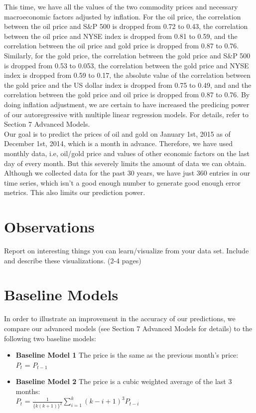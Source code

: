 \documentclass[runningheads]{llncs}
\begin{document}
\noindent This time, we have all the values of the two commodity prices and necessary macroeconomic factors adjusted by inflation. For the oil price, the correlation between the oil price and S\&P 500 is dropped from 0.72 to 0.43, the correlation between the oil price and NYSE index is dropped from 0.81 to 0.59, and the correlation between the oil price and gold price is dropped from 0.87 to 0.76. Similarly, for the gold price, the correlation between the gold price and S\&P 500 is dropped from 0.53 to 0.053, the correlation between the gold price and NYSE index is dropped from 0.59 to 0.17, the absolute value of the correlation between the gold price and the US dollar index is dropped from 0.75 to 0.49, and and the correlation between the gold price and oil price is dropped from 0.87 to 0.76. By doing inflation adjustment, we are certain to have increased the predicing power of our autoregressive with multiple linear regression models. For details, refer to Section 7 Advanced Models. \\

\noindent Our goal is to predict the prices of oil and gold on January 1st, 2015 as of December 1st, 2014, which is a month in advance. Therefore, we have used monthly data, i.e, oil/gold price and values of other economic factors on the last day of every month. But this severely limits the amount of data we can obtain. Although we collected data for the past 30 years, we have just 360 entries in our time series, which isn't a good enough number to generate good enough error metrics. This also limits our prediction power. \\


\section{Observations}

Report on interesting things you can learn/visualize from your data set.  Include and describe these visualizations.  (2-4 pages)


\section{Baseline Models}
In order to illustrate an improvement in the accuracy of our predictions, we compare our advanced models (see Section 7 Advanced Models for details) to the following two baseline models:

\begin {itemize}
\item \textbf{Baseline Model 1} The price is the same as the previous month's price: \\
$P_{t}$ = $P_{t-1}$\\
\item \textbf{Baseline Model 2} The price is a cubic weighted average of the last 3 months: \\
$P_{t}$ = $\frac{1}{\{k(k+1)\}^2}\sum\limits_{i=1}^k (k-i+1)^3P_{t-i}$
\end {itemize}
\end{document}
